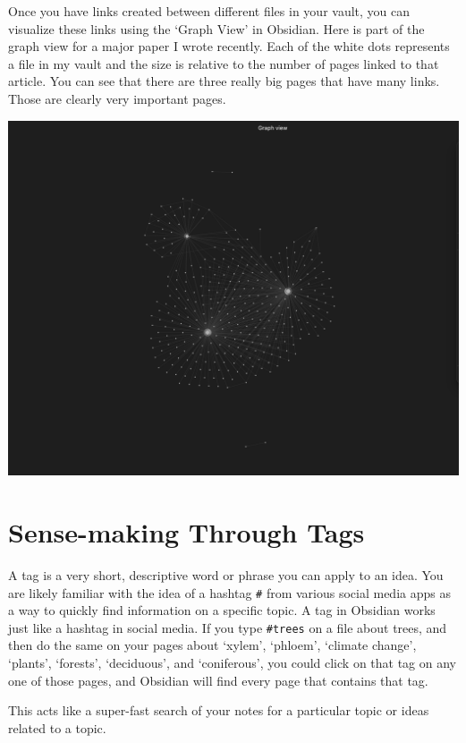 \documentclass[
]{book}
\theoremstyle{definition}
\theoremstyle{definition}
\theoremstyle{definition}
\theoremstyle{definition}
\theoremstyle{remark}
\begin{document}
Once you have links created between different files in your vault, you can visualize these links using the `Graph View' in Obsidian. Here is part of the graph view for a major paper I wrote recently. Each of the white dots represents a file in my vault and the size is relative to the number of pages linked to that article. You can see that there are three really big pages that have many links. Those are clearly very important pages.

\includegraphics{assets/u3/graph2.png}

\hypertarget{sense-making-through-tags}{%
\section{Sense-making Through Tags}\label{sense-making-through-tags}}

A tag is a very short, descriptive word or phrase you can apply to an idea. You are likely familiar with the idea of a hashtag \texttt{\#} from various social media apps as a way to quickly find information on a specific topic. A tag in Obsidian works just like a hashtag in social media. If you type \texttt{\#trees} on a file about trees, and then do the same on your pages about `xylem', `phloem', `climate change', `plants', `forests', `deciduous', and `coniferous', you could click on that tag on any one of those pages, and Obsidian will find every page that contains that tag.

This acts like a super-fast search of your notes for a particular topic or ideas related to a topic.
\end{document}
